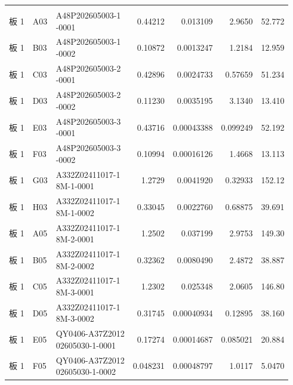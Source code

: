 \documentclass[UTF8,10pt,a4paper,fontset=fandol]{ctexart}
\begin{document}
\scriptsize
\begin{tabular}{@{}llp{3.1cm}rrrr@{}}
\hline
 & & & & & & & \\
板 1 & A03 & \shortstack[l]{A48P202605003-1\\-0001} & 0.44212 & 0.013109 & 2.9650 & 52.772 \\
板 1 & B03 & \shortstack[l]{A48P202605003-1\\-0002} & 0.10872 & 0.0013247 & 1.2184 & 12.959 \\
板 1 & C03 & \shortstack[l]{A48P202605003-2\\-0001} & 0.42896 & 0.0024733 & 0.57659 & 51.234 \\
板 1 & D03 & \shortstack[l]{A48P202605003-2\\-0002} & 0.11230 & 0.0035195 & 3.1340 & 13.410 \\
板 1 & E03 & \shortstack[l]{A48P202605003-3\\-0001} & 0.43716 & 0.00043388 & 0.099249 & 52.192 \\
板 1 & F03 & \shortstack[l]{A48P202605003-3\\-0002} & 0.10994 & 0.00016126 & 1.4668 & 13.113 \\
板 1 & G03 & \shortstack[l]{A332Z02411017-1\\8M-1-0001} & 1.2729 & 0.0041920 & 0.32933 & 152.12 \\
板 1 & H03 & \shortstack[l]{A332Z02411017-1\\8M-1-0002} & 0.33045 & 0.0022760 & 0.68875 & 39.691 \\
板 1 & A05 & \shortstack[l]{A332Z02411017-1\\8M-2-0001} & 1.2502 & 0.037199 & 2.9753 & 149.30 \\
板 1 & B05 & \shortstack[l]{A332Z02411017-1\\8M-2-0002} & 0.32362 & 0.0080490 & 2.4872 & 38.887 \\
板 1 & C05 & \shortstack[l]{A332Z02411017-1\\8M-3-0001} & 1.2302 & 0.025348 & 2.0605 & 146.80 \\
板 1 & D05 & \shortstack[l]{A332Z02411017-1\\8M-3-0002} & 0.31745 & 0.00040934 & 0.12895 & 38.160 \\
板 1 & E05 & \shortstack[l]{QY0406-A37Z2012\\02605030-1-0001} & 0.17274 & 0.00014687 & 0.085021 & 20.884 \\
板 1 & F05 & \shortstack[l]{QY0406-A37Z2012\\02605030-1-0002} & 0.048231 & 0.00048797 & 1.0117 & 5.0470 \\

\end{tabular}
\end{document}
